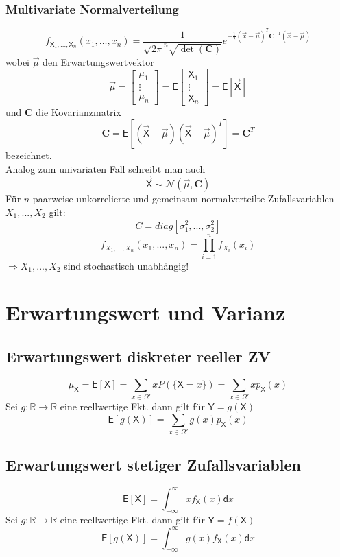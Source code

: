 \documentclass[a4paper,twocolumn,10pt]{article}
\newcommand{\erw}{\mathsf{E}}
\begin{document}
\subsubsection{Multivariate Normalverteilung}
\[f_{\mathsf X_1,\dots,\mathsf X_n}(x_1,\dots,x_n)= \frac{1}{\sqrt{2\pi}^n\sqrt{\det(\mathbf C)}}e^{-\frac{1}{2}(\vec x - \vec \mu)^T\mathbf C^{-1}(\vec x - \vec \mu)}\]
wobei $\vec \mu$ den Erwartungswertvektor \[
\vec \mu = \begin{bmatrix} \mu_1\\\vdots \\\mu_n \end{bmatrix} =  \erw \begin{bmatrix} \mathsf X_1\\\vdots \\\mathsf X_n \end{bmatrix} = \erw[\vec{\mathsf X}]\] und $\mathbf C$ die Kovarianzmatrix \[\mathbf C = \erw[(\vec{\mathsf X} - \vec \mu)(\vec{\mathsf X} - \vec \mu)^T] = \mathbf C^T\] bezeichnet.\\
Analog zum univariaten Fall schreibt man auch \[\vec{\mathsf X} \sim \mathcal N(\vec \mu, \mathbf C)\]
Für $n$ paarweise unkorrelierte und gemeinsam normalverteilte Zufallsvariablen $X_1,...,X_2$ gilt:
\[C=diag[\sigma_1^2,...,\sigma_2^2]\]
\[f_{X_1,...,X_n}(x_1,...,x_n)=\prod\limits_{i=1}^{n}f_{X_i}(x_i)\]
$\Rightarrow X_1,...,X_2$ sind stochastisch unabhängig!

\section{Erwartungswert und Varianz}

\subsection{Erwartungswert diskreter reeller ZV}
\[\mu_{\mathsf{X}}=\erw[\mathsf X] = \sum_{x \in \Omega'}xP(\{\mathsf X = x\}) = \sum_{x \in \Omega'}xp_\mathsf X(x)\]
Sei $g: \mathbb R \rightarrow \mathbb R$ eine reellwertige Fkt. dann gilt für $\mathsf Y = g(\mathsf X)$ \[\erw[g(\mathsf X)] = \sum_{x \in \Omega'}g(x)p_\mathsf X(x)\]

\subsection{Erwartungswert stetiger Zufallsvariablen}
\[\erw[\mathsf X] = \int_{-\infty}^{\infty}xf_\mathsf X(x)\mathsf dx\]
Sei $g: \mathbb R \rightarrow \mathbb R$ eine reellwertige Fkt. dann gilt für $\mathsf Y = f(\mathsf X)$ \[\erw[g(\mathsf X)] = \int_{-\infty}^{\infty}g(x)f_\mathsf X(x)\mathsf dx\]
\end{document}
